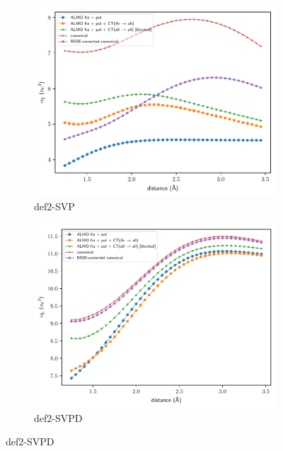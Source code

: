 \documentclass{beamer}
\begin{document}
\begin{frame}
  \begin{figure}
    \centering
    \begin{subfigure}[b]{0.49\linewidth}
      \includegraphics[width=\linewidth,keepaspectratio]{../paper_04/almo_vs_bsse_canonical_onaxis_projected_short_def2-SVP.pdf}
      \caption*{\scriptsize def2-SVP}
    \end{subfigure}
    \begin{subfigure}[b]{0.49\linewidth}
      \includegraphics[width=\linewidth,keepaspectratio]{../paper_04/almo_vs_bsse_canonical_onaxis_projected_short_def2-SVPD.pdf}
      \caption*{\scriptsize def2-SVPD}
    \end{subfigure}
  \end{figure}
\end{frame}
\end{document}
